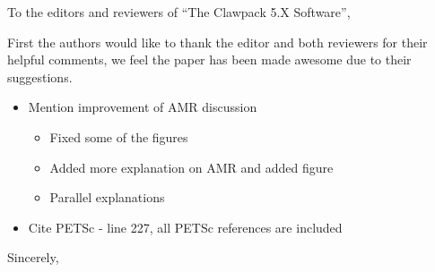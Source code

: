 \documentclass{letter}
\begin{document}
\address{Clawpack Developers}
\signature{Kyle T. Mandli, \\
           Aron J. Ahmadia, \\
           Donna Calhoun, \\
           David George, \\
           Yiannis Hadjimichael, \\ 
           David I. Ketcheson, \\
           Grady I. Lemoine, and \\
           Randall J. LeVeque}

\begin{letter}
{
}

\opening{To the editors and reviewers of ``The Clawpack 5.X Software'',}

First the authors would like to thank the editor and both reviewers for their
helpful comments, we feel the paper has been made awesome due to their
suggestions.

\begin{itemize}
    \item Mention improvement of AMR discussion
    \begin{itemize}
        \item Fixed some of the figures
        \item Added more explanation on AMR and added figure
        \item Parallel explanations
    \end{itemize}
    \item Cite PETSc - line 227, all PETSc references are included
\end{itemize}

\vspace{4cm}

\closing{Sincerely,}

\end{letter}
\end{document}
